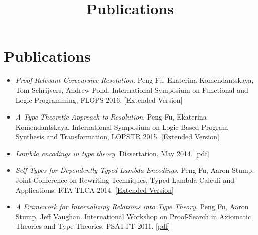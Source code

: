 \documentclass[10pt]{article}
\title{\bfseries\Large Publications}
\date{}
\begin{document}
\maketitle
\vspace{-4em}

\vspace{20pt}





\section*{Publications}

\begin{itemize}
\item \textit{Proof Relevant Corecursive Resolution}. Peng Fu, Ekaterina Komendantskaya, Tom Schrijvers, Andrew Pond. International Symposium on Functional and Logic Programming, FLOPS 2016. [Extended Version]
\item \textit{A Type-Theoretic Approach to Resolution}. Peng Fu, Ekaterina Komendantskaya. International Symposium on Logic-Based Program Synthesis and Transformation, LOPSTR 2015. [\href{../../document/papers/tm-lp.pdf}{Extended Version}]

\item \textit{Lambda encodings in type theory}. Dissertation, May 2014. [\href{../../document/papers/dissertation.pdf}{pdf}]

\item \textit{Self Types for Dependently Typed Lambda Encodings}. Peng Fu, Aaron Stump. Joint Conference on Rewriting Techniques, Typed Lambda Calculi and Applications. RTA-TLCA 2014. [\href{../../document/papers/rta-tlca.pdf}{Extended Version}]

\item \textit{A Framework for Internalizing Relations into Type Theory}. Peng Fu, Aaron Stump, Jeff Vaughan. International Workshop on Proof-Search in Axiomatic Theories and Type Theories, PSATTT-2011. [\href{../../document/papers/psattt-paper.pdf}{pdf}]
  
\end{itemize}
\end{document}
